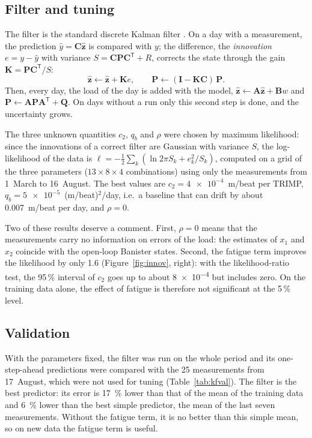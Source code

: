 \documentclass[11pt,a4paper]{article}
\begin{document}
\subsection{Filter and tuning}
The filter is the standard discrete Kalman filter \citep{kalman1960, simon2006}.
On a day with a measurement, the prediction $\hat y = \mathbf{C}\hat{\mathbf{z}}$ is
compared with $y$; the difference, the \emph{innovation} $e = y - \hat y$ with
variance $S = \mathbf{C}\mathbf{P}\mathbf{C}^{\mathsf T} + R$, corrects the state through the gain
$\mathbf{K} = \mathbf{P}\mathbf{C}^{\mathsf T}/S$:
\begin{equation}
\hat{\mathbf{z}} \leftarrow \hat{\mathbf{z}} + \mathbf{K}e, \qquad
\mathbf{P} \leftarrow (\mathbf{I} - \mathbf{K}\mathbf{C})\,\mathbf{P}.
\end{equation}
Then, every day, the load of the day is added with the model,
$\hat{\mathbf{z}} \leftarrow \mathbf{A}\hat{\mathbf{z}} + \mathbf{B}w$ and
$\mathbf{P} \leftarrow \mathbf{A}\mathbf{P}\mathbf{A}^{\mathsf T} + \mathbf{Q}$. On days without a
run only this second step is done, and the uncertainty grows.

The three unknown quantities $c_2$, $q_b$ and $\rho$ were chosen by maximum
likelihood: since the innovations of a correct filter are Gaussian with variance
$S$, the log-likelihood of the data is
$\ell = -\tfrac12 \sum_k \left(\ln 2\pi S_k + e_k^2/S_k\right)$, computed on a grid of
the three parameters ($13 \times 8 \times 4$ combinations) using only the
measurements from 1~March to 16~August. The best values are
$c_2 = \num{4e-4}$~m/beat per TRIMP, $q_b = \num{5e-5}$~(m/beat)$^2$/day, i.e.\ a
baseline that can drift by about \SI{0.007}{m/beat} per day, and $\rho = 0$.

Two of these results deserve a comment. First, $\rho = 0$ means that the
measurements carry no information on errors of the load: the estimates of $x_1$
and $x_2$ coincide with the open-loop Banister states. Second, the fatigue term
improves the likelihood by only 1.6 (Figure~\ref{fig:innov}, right): with the
likelihood-ratio test, the 95\,\% interval of $c_2$ goes up to about
\num{8e-4} but includes zero. On the training data alone, the effect of
fatigue is therefore not significant at the 5\,\% level.

\subsection{Validation}
With the parameters fixed, the filter was run on the whole period and its
one-step-ahead predictions were compared with the 25 measurements from 17~August,
which were not used for tuning (Table~\ref{tab:kfval}). The filter is the best
predictor: its error is \SI{17}{\percent} lower than that of the mean of the
training data and \SI{6}{\percent} lower than the best simple predictor, the
mean of the last seven measurements. Without the fatigue term, it is no better
than this simple mean, so on new data the fatigue term is useful.
\end{document}
